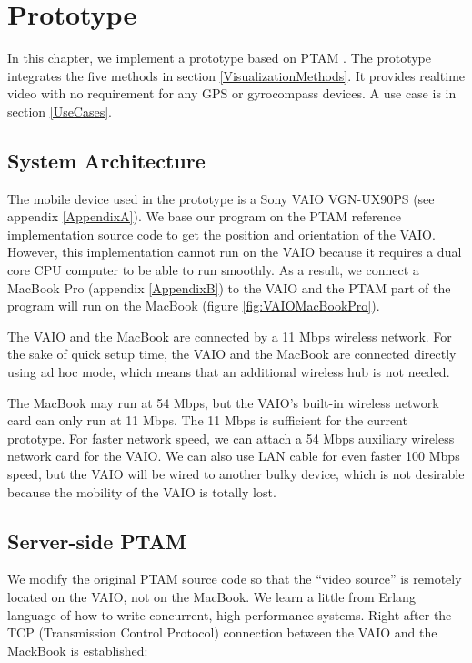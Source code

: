 \chapter{Prototype}
\label{Chapter3}

In this chapter, we implement a prototype based on PTAM \cite{Reference12}. The prototype integrates the five methods in section \ref{VisualizationMethods}. It provides realtime video with no requirement for any GPS or gyrocompass devices. A use case is in section \ref{UseCases}.


\section{System Architecture}

The mobile device used in the prototype is a Sony VAIO VGN-UX90PS (see appendix \ref{AppendixA}). We base our program on the PTAM reference implementation source code \cite{Reference16} to get the position and orientation of the VAIO. However, this implementation cannot run on the VAIO because it requires a dual core CPU computer to be able to run smoothly. As a result, we connect a MacBook Pro (appendix \ref{AppendixB}) to the VAIO and the PTAM part of the program will run on the MacBook (figure \ref{fig:VAIOMacBookPro}).

The VAIO and the MacBook are connected by a 11 Mbps wireless network. For the sake of quick setup time, the VAIO and the MacBook are connected directly using ad hoc mode, which means that an additional wireless hub is not needed.

The MacBook may run at 54 Mbps, but the VAIO's built-in wireless network card can only run at 11 Mbps. The 11 Mbps is sufficient for the current prototype. For faster network speed, we can attach a 54 Mbps auxiliary wireless network card for the VAIO. We can also use LAN cable for even faster 100 Mbps speed, but the VAIO will be wired to another bulky device, which is not desirable because the mobility of the VAIO is totally lost.


\section{Server-side PTAM}

We modify the original PTAM source code so that the ``video source'' is remotely located on the VAIO, not on the MacBook. We learn a little from Erlang language \cite{Reference17} of how to write concurrent, high-performance systems. Right after the TCP (Transmission Control Protocol) connection between the VAIO and the MackBook is established:

